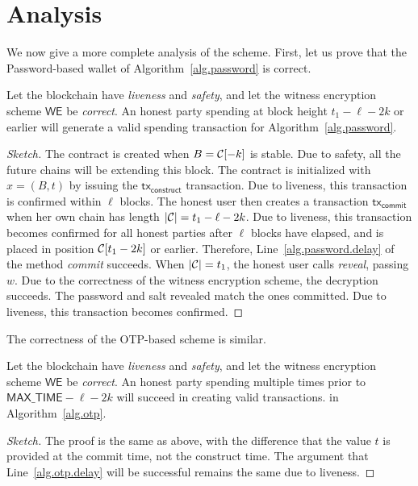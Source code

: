 \section{Analysis}\label{sec:analysis}

We now give a more complete analysis of the scheme. First, let us prove that the Password-based
wallet of Algorithm~\ref{alg.password} is correct.

\begin{theorem}
  Let the blockchain have \emph{liveness} and \emph{safety},
  and let the witness encryption scheme $\textsf{WE}$ be \emph{correct}.
  An honest party spending at block height $t_1 - \ell - 2k$ or earlier
  will generate a valid spending transaction
  for Algorithm~\ref{alg.password}.
\end{theorem}
\begin{proof}[Sketch]
  The contract is created when $B = \mathcal{C}[-k]$ is stable. Due to safety, all the future chains
  will be extending this block. The contract is initialized with $x = (B, t)$ by issuing the
  $\textsf{tx}_\textsf{construct}$ transaction. Due to liveness, this transaction is confirmed
  within $\ell$ blocks.
  The honest user then creates a transaction $\textsf{tx}_\textsf{commit}$ when her
  own chain has length $|\mathcal{C}| = t_1 - \ell - 2k$.
  Due to liveness, this transaction becomes confirmed for all honest parties after $\ell$ blocks
  have elapsed, and is placed in position $\mathcal{C}[t_1 - 2k]$ or earlier. Therefore, Line~\ref{alg.password.delay}
  of the method \emph{commit} succeeds. When $|\mathcal{C}| = t_1$, the honest user calls
  \emph{reveal}, passing $w$. Due to the correctness of the witness encryption scheme,
  the decryption succeeds. The password and salt revealed match the ones committed.
  Due to liveness, this transaction becomes confirmed.
\end{proof}

The correctness of the OTP-based scheme is similar.

\begin{theorem}
  Let the blockchain have \emph{liveness} and \emph{safety},
  and let the witness encryption scheme $\textsf{WE}$ be \emph{correct}.
  An honest party spending multiple times prior to $\textsf{MAX\_TIME} - \ell - 2k$
  will succeed in creating valid transactions.
  in Algorithm~\ref{alg.otp}.
\end{theorem}
\begin{proof}[Sketch]
  The proof is the same as above, with the difference that the value $t$ is provided
  at the \textsf{commit} time, not the \textsf{construct} time. The argument that
  Line~\ref{alg.otp.delay} will be successful remains the same due to liveness.
\end{proof}


